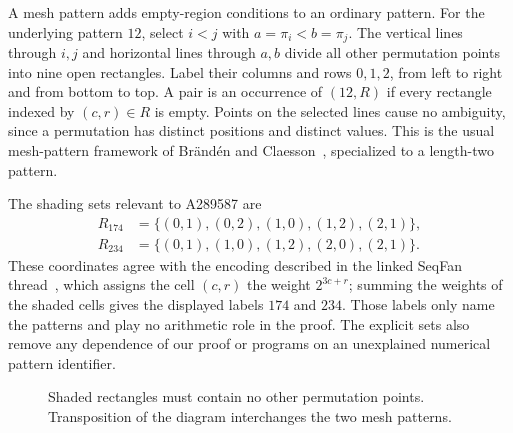\documentclass[11pt,letterpaper]{article}
\numberwithin{equation}{section}
\theoremstyle{definition}
\newcommand{\Rone}{R_{174}}
\newcommand{\Rtwo}{R_{234}}
\begin{document}
A mesh pattern adds empty-region conditions to an ordinary pattern.
For the underlying pattern $12$, select $i<j$ with $a=\pi_i<b=\pi_j$.
The vertical lines through $i,j$ and horizontal lines through $a,b$ divide
all other permutation points into nine open rectangles. Label their
columns and rows $0,1,2$, from left to right and from bottom to top.
A pair is an occurrence of $(12,R)$ if every rectangle indexed by
$(c,r)\in R$ is empty. Points on the selected lines cause no ambiguity,
since a permutation has distinct positions and distinct values.
This is the usual mesh-pattern framework of Br\"and\'en and
Claesson~\cite{branden-claesson}, specialized to a length-two pattern.

The shading sets relevant to A289587 are
\begin{align}
 \Rone&=\{(0,1),(0,2),(1,0),(1,2),(2,1)\},\label{eq:Rone}\\
 \Rtwo&=\{(0,1),(1,0),(1,2),(2,0),(2,1)\}.
 \label{eq:Rtwo}
\end{align}
These coordinates agree with the encoding described in the linked SeqFan
thread~\cite{seqfan}, which assigns the cell $(c,r)$ the weight $2^{3c+r}$;
summing the weights of the shaded cells gives the displayed labels $174$
and $234$. Those labels only name the patterns and play no arithmetic role
in the proof. The explicit sets also remove any dependence of our proof or
programs on an unexplained numerical pattern identifier.

\begin{figure}[ht]
\centering
{}
\caption{Shaded rectangles must contain no other permutation points.
Transposition of the diagram interchanges the two mesh patterns.}
\label{fig:meshes}
\end{figure}
\end{document}
